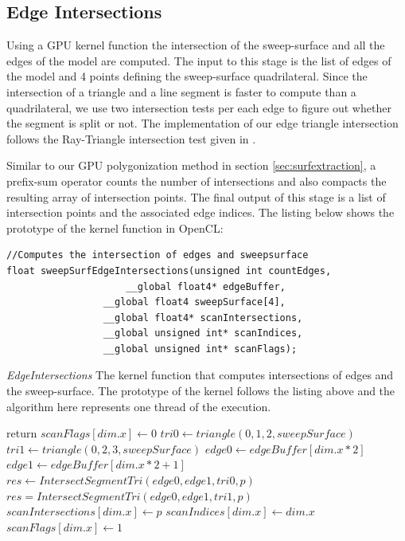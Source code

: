 \subsection{Edge Intersections}
Using a GPU kernel function the intersection of the sweep-surface and all the edges of the model are computed. 
The input to this stage is the list of edges of the model and 4 points defining the sweep-surface quadrilateral. 
Since the intersection of a triangle and a line segment is faster to compute than a quadrilateral, we 
use two intersection tests per each edge to figure out whether the segment is split or not. The implementation
of our edge triangle intersection follows the Ray-Triangle intersection test given in \cite{RTR3}.


Similar to our GPU polygonization method in section \ref{sec:surfextraction}, a prefix-sum operator counts the number
of intersections and also compacts the resulting array of intersection points. The final output of this stage is a list
of intersection points and the associated edge indices. The listing below shows the prototype of the kernel function in 
OpenCL:

\begin{lstlisting}[frame=single]
//Computes the intersection of edges and sweepsurface
float sweepSurfEdgeIntersections(unsigned int countEdges,
			         __global float4* edgeBuffer,
				 __global float4 sweepSurface[4],
				 __global float4* scanIntersections,
				 __global unsigned int* scanIndices,
				 __global unsigned int* scanFlags);
\end{lstlisting}
		     
\begin{algorithm}[H]
\caption{\textit{EdgeIntersections} The kernel function that computes intersections of edges 
and the sweep-surface. The prototype of the kernel follows the listing above and the algorithm here represents one 
thread of the execution. }
\label{alg:edgeIntersections}
\begin{algorithmic}[1]	
  \STATE return
  \ENDIF
  \STATE $scanFlags[dim.x] \gets 0$
  \STATE $tri0 \gets triangle(0, 1, 2, sweepSurface)$
  \STATE $tri1 \gets triangle(0, 2, 3, sweepSurface)$
  \STATE $edge0 \gets edgeBuffer[dim.x * 2]$
  \STATE $edge1 \gets edgeBuffer[dim.x * 2 + 1]$
  \STATE $res \gets IntersectSegmentTri(edge0, edge1, tri0, p)$
  \STATE $res = IntersectSegmentTri(edge0, edge1, tri1, p)$
  \ENDIF
  \STATE $scanIntersections[dim.x] \gets p$
  \STATE $scanIndices[dim.x] \gets dim.x$
  \STATE $scanFlags[dim.x] \gets 1$
  \ENDIF
  
\end{algorithmic}
\end{algorithm}

